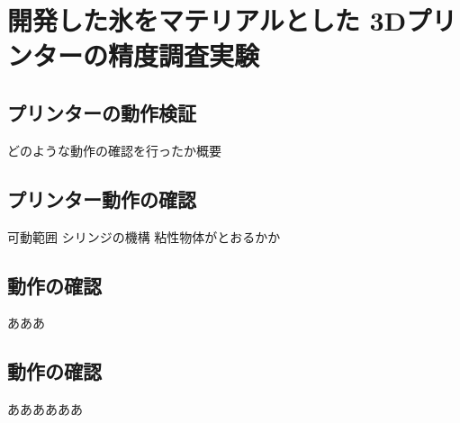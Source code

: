 


\chapter{開発した氷をマテリアルとした
3Dプリンターの精度調査実験}
\label{chp:first}

\section{プリンターの動作検証}
\label{sec:paragraph}

どのような動作の確認を行ったか概要

\section{プリンター動作の確認}
\label{sec:paragraph}

可動範囲
シリンジの機構
粘性物体がとおるかか


\section{動作の確認}
\label{sec:paragraph}

あああ

\section{動作の確認}
\label{sec:paragraph}


ああああああ
